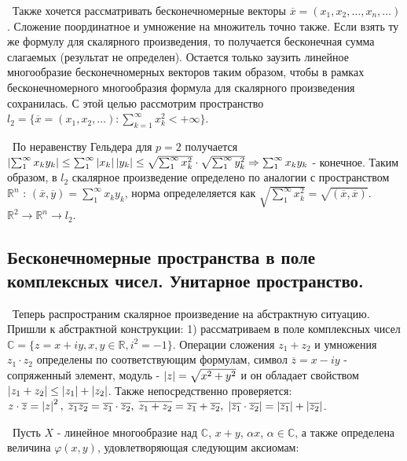 \noindent \textbullet~Также хочется рассматривать бесконечномерные векторы $\overline{x} = (x_1, x_2, \dots, x_n, \dots)$. Сложение поординатное и умножение на множитель
точно также. Если взять ту же формулу для скалярного произведения, то получается бесконечная сумма слагаемых (результат не определен). Остается только заузить линейное 
многообразие бесконечномерных векторов таким образом, чтобы в рамках бесконечномерного многообразия формула для скалярного произведения сохранилась. С этой целью 
рассмотрим пространство $l_2 = \{ \overline{x} = (x_1, x_2, \dots) : \sum_{k = 1}^\infty x_k^2 < +\infty \} $. 

\smallskip 
\noindent \textbullet~По неравенству Гельдера для $p = 2$ получается $\left\lvert\sum_1^\infty x_k y_k\right\rvert \le \sum_1^\infty \left\lvert x_k\right\rvert \left\lvert y_k\right\rvert \le 
\sqrt{\sum_1^\infty x_k^2} \cdot \sqrt{\sum_1^\infty y_k^2} \Rightarrow \sum_1^\infty x_k y_k$ - конечное. Таким образом, в $l_2$ скалярное произведение определено 
по аналогии с пространством $\mathbb{R}^n$ : $(\overline{x}, \overline{y}) = \sum_1^\infty x_k y_k$, норма определеляется как $\sqrt{\sum_1^\infty x_k^2} = 
\sqrt{(\overline{x}, \overline{x})}$. $\mathbb{R}^2 \rightarrow \mathbb{R}^n \rightarrow l_2$. 


\subsection*{Бесконечномерные пространства в поле комплексных чисел. Унитарное пространство. }

\noindent \textbullet~Теперь распространим скалярное произведение на абстрактную ситуацию. Пришли к абстрактной конструкции: 1) рассматриваем в поле комплексных чисел 
$\mathbb{C} = \{ z = x + i y, x, y \in \mathbb{R}, i^2 = -1\}$. Операции сложения $z_1 + z_2$ и умножения $z_1 \cdot z_2$ определены по соответствующим формулам, 
символ $\overline{z} = x - i y$ - сопряженный элемент, модуль - $\left\lvert z\right\rvert = \sqrt{x^2 + y^2}$ и он обладает свойством $\left\lvert z_1 + z_2\right\rvert \le \left\lvert z_1\right\rvert + \left\lvert z_2\right\rvert$. Также 
непосредственно проверяется: $z \cdot \overline{z} = \left\lvert z\right\rvert^2, \; \overline{z_1 z_2} = \overline{z_1} \cdot \overline{z_2}, \; \overline{z_1 + z_2} = 
\overline{z_1} + \overline{z_2}, \; \left\lvert\overline{z_1} \cdot \overline{z_2}\right\rvert = \left\lvert\overline{z_1}\right\rvert + \left\lvert\overline{z_2}\right\rvert$.

\bigskip 
\noindent \textasteriskcentered~Пусть $X$ - линейное многообразие над $\mathbb{C}$, $x + y$, $\alpha x$, $\alpha \in \mathbb{C}$, 
а также определена величина $\varphi(x, y)$, удовлетворяющая следующим аксиомам:

